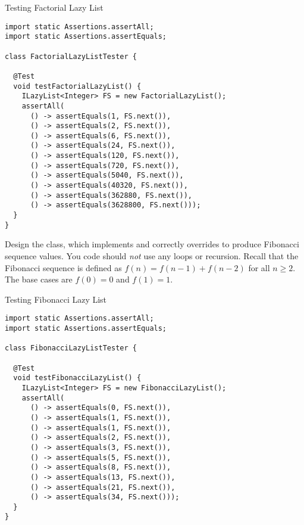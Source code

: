 \begin{cl}{Testing Factorial Lazy List}
\begin{lstlisting}[language=MyJava]
import static Assertions.assertAll;
import static Assertions.assertEquals;

class FactorialLazyListTester {

  @Test
  void testFactorialLazyList() {
    ILazyList<Integer> FS = new FactorialLazyList();
    assertAll(
      () -> assertEquals(1, FS.next()),
      () -> assertEquals(2, FS.next()),
      () -> assertEquals(6, FS.next()),
      () -> assertEquals(24, FS.next()),
      () -> assertEquals(120, FS.next()),
      () -> assertEquals(720, FS.next()),
      () -> assertEquals(5040, FS.next()),
      () -> assertEquals(40320, FS.next()),
      () -> assertEquals(362880, FS.next()),
      () -> assertEquals(3628800, FS.next()));
  }
}
\end{lstlisting}
\end{cl}

Design the  class, which implements  and correctly overrides  to produce Fibonacci sequence values. You code should \textit{not} use any loops or recursion. Recall that the Fibonacci sequence is defined as $f(n) = f(n - 1) + f(n - 2)$ for all $n\geq{2}$. The base cases are $f(0) = 0$ and $f(1) = 1$.

\begin{cl}{Testing Fibonacci Lazy List}
\begin{lstlisting}[language=MyJava]
import static Assertions.assertAll;
import static Assertions.assertEquals;

class FibonacciLazyListTester {

  @Test
  void testFibonacciLazyList() {
    ILazyList<Integer> FS = new FibonacciLazyList();
    assertAll(
      () -> assertEquals(0, FS.next()),
      () -> assertEquals(1, FS.next()),
      () -> assertEquals(1, FS.next()),
      () -> assertEquals(2, FS.next()),
      () -> assertEquals(3, FS.next()),
      () -> assertEquals(5, FS.next()),
      () -> assertEquals(8, FS.next()),
      () -> assertEquals(13, FS.next()),
      () -> assertEquals(21, FS.next()),
      () -> assertEquals(34, FS.next()));
  }
}
\end{lstlisting}
\end{cl}


